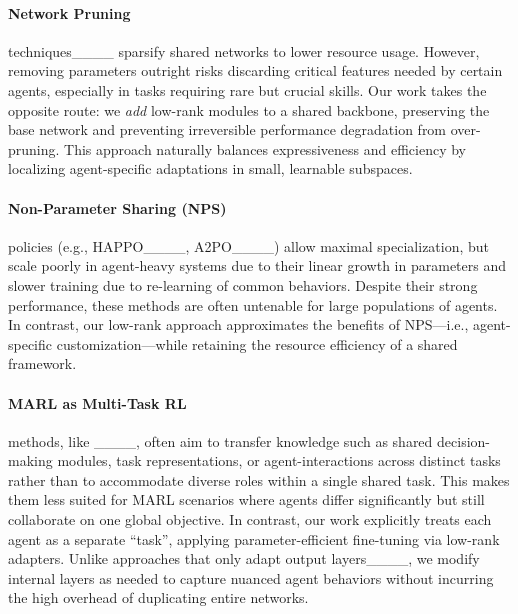 \paragraph{Network Pruning} techniques____ sparsify shared networks to lower resource usage. However, removing parameters outright risks discarding critical features needed by certain agents, especially in tasks requiring rare but crucial skills. Our work takes the opposite route: we \emph{add} low-rank modules to a shared backbone, preserving the base network and preventing irreversible performance degradation from over-pruning. This approach naturally balances expressiveness and efficiency by localizing agent-specific adaptations in small, learnable subspaces.

\paragraph{Non-Parameter Sharing (NPS)} policies (e.g., HAPPO____, A2PO____) allow maximal specialization, but scale poorly in agent-heavy systems due to their linear growth in parameters and slower training due to re-learning of common behaviors. Despite their strong performance, these methods are often untenable for large populations of agents. In contrast, our low-rank approach approximates the benefits of NPS—i.e., agent-specific customization—while retaining the resource efficiency of a shared framework.

\paragraph{MARL as Multi-Task RL} methods, like ____, often aim to transfer knowledge such as shared decision-making modules, task representations, or agent-interactions across distinct tasks rather than to accommodate diverse roles within a single shared task. This makes them less suited for MARL scenarios where agents differ significantly but still collaborate on one global objective. In contrast, our work explicitly treats each agent as a separate “task”, applying parameter-efficient fine-tuning via low-rank adapters. Unlike approaches that only adapt output layers____, we modify internal layers as needed to capture nuanced agent behaviors without incurring the high overhead of duplicating entire networks.